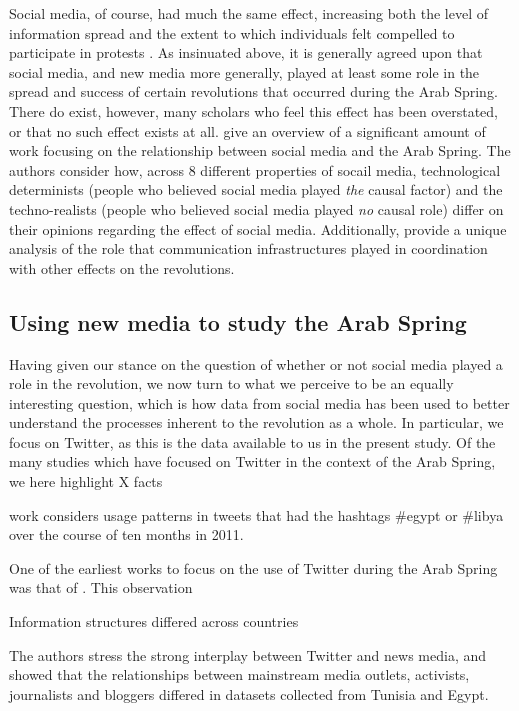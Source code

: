 Social media, of course, had much the same effect, increasing both the level of information spread and the extent to which individuals felt compelled to participate in protests \cite{tufekci_social_2012,wolfsfeld_social_2013,bellin_reconsidering_2012}. As insinuated above, it is generally agreed upon that social media, and new media more generally, played at least some role in the spread and success of certain revolutions that occurred during the Arab Spring.  There do exist, however, many scholars who feel this effect has been overstated, or that no such effect exists at all. \cite{comunello_will_2012} give an overview of a significant amount of work focusing on the relationship between social media and the Arab Spring.  The authors consider how, across 8 different properties of socail media, technological determinists (people who believed social media played \emph{the} causal factor) and the techno-realists (people who believed social media played \emph{no} causal role) differ on their opinions regarding the effect of social media.  Additionally, \cite{hussain_what_2013} provide a unique analysis of the role that communication infrastructures played in coordination with other effects on the revolutions.

\subsection{Using new media to study the Arab Spring}

Having given our stance on the question of whether or not social media played a role in the revolution, we now turn to what we perceive to be an equally interesting question, which is how data from social media has been used to better understand the processes inherent to the revolution as a whole.  In particular, we focus on Twitter, as this is the data available to us in the present study.  Of the many studies which have focused on Twitter in the context of the Arab Spring, we here highlight X facts

\cite{bruns_arab_2013} work considers usage patterns in tweets that had the hashtags \#egypt or \#libya over the course of ten months in 2011.  

One of the earliest works to focus on the use of Twitter during the Arab Spring was that of \cite{lotan_revolutions_2011}. This observation 

Information structures differed across countries 

	\cite{lotan_revolutions_2011}
		 The authors stress the strong interplay between Twitter and news media, and showed that the relationships between mainstream media outlets, activists, journalists and bloggers differed in datasets collected from Tunisia and Egypt. 

